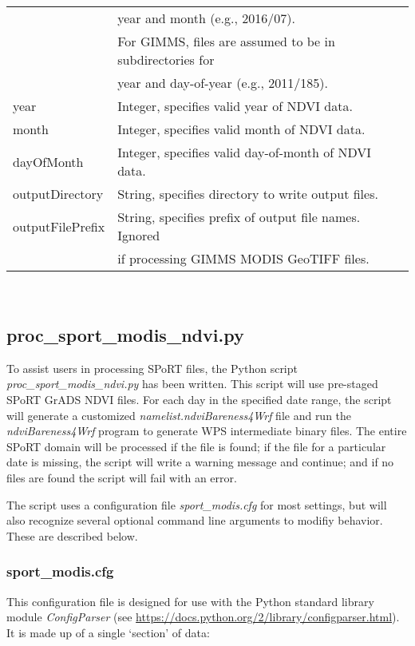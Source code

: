 \documentclass{article}
\begin{document}
\begin{tabular}{|l|l|}
               & year and month (e.g., 2016/07). \\
               & For GIMMS, files are assumed to be in subdirectories for \\
               & year and day-of-year (e.g., 2011/185). \\ \hline
year & Integer, specifies valid year of NDVI data. \\ \hline
month & Integer, specifies valid month of NDVI data. \\ \hline
dayOfMonth & Integer, specifies valid day-of-month of NDVI data. \\ \hline
outputDirectory & String, specifies directory to write output files. \\ \hline
outputFilePrefix & String, specifies prefix of output file names.  Ignored \\
                 & if processing GIMMS MODIS GeoTIFF files. \\ \hline
\end{tabular} \\

\subsection{proc\_sport\_modis\_ndvi.py}
\label{subsec:procSportModisNdviPy}

To assist users in processing SPoRT files, the Python script 
\textit{proc\_sport\_modis\_ndvi.py} has been written.  This script will 
use pre-staged SPoRT GrADS NDVI files.  For each day in the specified date 
range, the script will generate a customized 
\textit{namelist.ndviBareness4Wrf} file and run the \textit{ndviBareness4Wrf}
program to generate WPS intermediate binary files.  The entire SPoRT domain
will be processed if the file is found; if the file for a particular date is
missing, the script will write a warning message and continue; and if no
files are found the script will fail with an error. 

The script uses a configuration file \textit{sport\_modis.cfg} for most
settings, but will also recognize several optional command line arguments to
modifiy behavior.  These are described below.

\subsubsection{sport\_modis.cfg}
\label{subsubsec:sportModisCfg}

This configuration file is designed for use with the Python standard library
module \textit{ConfigParser} (see 
\url{https://docs.python.org/2/library/configparser.html}).  It is made up
of a single `section' of data: \\
\end{document}
